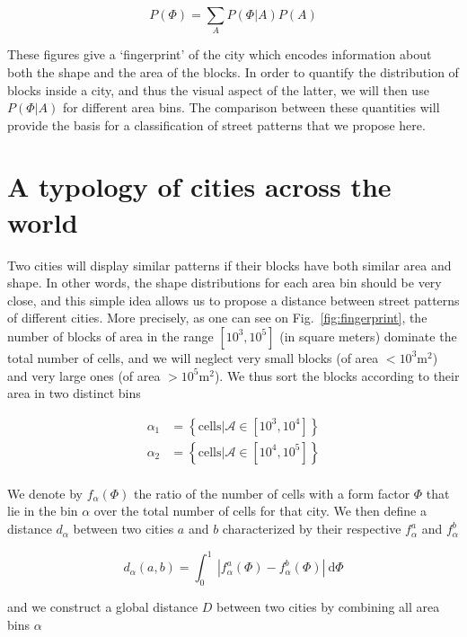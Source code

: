 \begin{equation} 
    P(\Phi)=\sum_AP(\Phi|A)P(A) 
\end{equation}

These figures give a `fingerprint' of the city which encodes information about
both the shape and the area of the blocks. In order to quantify the distribution
of blocks inside a city, and thus the visual aspect of the latter, we will then
use $P(\Phi|A)$ for different area bins. The comparison between these quantities
will provide the basis for a classification of street patterns that we propose
here.


\section{A typology of cities across the world}

Two cities will display similar patterns if their blocks have both similar area
and shape. In other words, the shape distributions for each area bin should be
very close, and this simple idea allows us to propose a distance between street
patterns of different cities. More precisely, as one can see on
Fig.~\ref{fig:fingerprint}, the number of blocks of area in the range
$[10^3,10^5]$ (in square meters) dominate the total number of cells, and we will
neglect very small blocks (of area $<10^3\text{m}^2$) and very large ones (of
area $>10^5\text{m}^2$). We thus sort the blocks according to their area in two
distinct bins

\begin{align*} 
    \alpha_1 &= \left\{ \text{cells} | \mathcal{A} \in \left[10^3,
10^4\right]\right\}\\ 
    \alpha_2 &= \left\{ \text{cells} | \mathcal{A} \in
\left[10^4, 10^5\right]\right\}\\ 
\end{align*}

We denote by $f_\alpha(\Phi)$ the ratio of the number of cells with a form
factor $\Phi$ that lie in the bin $\alpha$ over the total number of cells for
that city. We then define a distance $d_\alpha$ between two cities $a$ and $b$
characterized by their respective $f^{a}_\alpha$ and $f^{b}_\alpha$

\begin{equation} 
    d_\alpha(a,b) = \int_0^1\: | f^{a}_\alpha(\Phi) -
f^{b}_\alpha(\Phi) |\: \mathrm{d}\Phi 
\end{equation} 

and we construct a global distance $D$ between two cities by combining all area
bins $\alpha$

